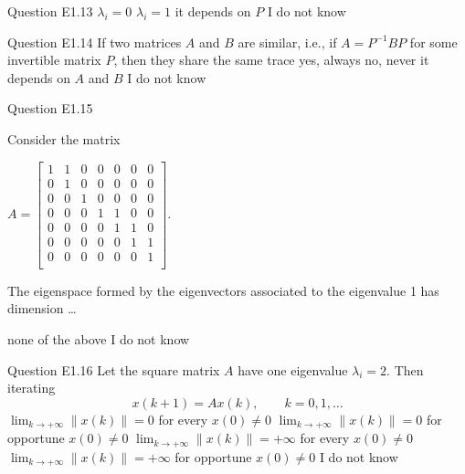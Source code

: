\begin{frame}{Question E1.13}
	\QuestionAnswers
	{
		\correctanswer $\lambda_{i} = 0$
		\answer $\lambda_{i} = 1$
		\answer it depends on $P$
		\answer I do not know
	}
	\QuestionSolution{}
	\QuestionAuthor{}
	\QuestionVersion{}
\end{frame}


\begin{frame}{Question E1.14}
	\QuestionBody
	{
		If two matrices $A$ and $B$ are similar, i.e., if
		$A = P^{-1} B P$
		for some invertible matrix $P$, then they share the same trace
	}
	\QuestionAnswers
	{
		\correctanswer yes, always
		\answer no, never
		\answer it depends on $A$ and $B$
		\answer I do not know
	}
	\QuestionSolution{}
	\QuestionAuthor{}
	\QuestionVersion{}
\end{frame}


\begin{frame}{Question E1.15}
	\QuestionBody
	{
		Consider the matrix
		\begin{small}
		$
		A = 
		\begin{bmatrix}
			1 & 1 & 0 & 0 & 0 & 0 & 0 \\
			0 & 1 & 0 & 0 & 0 & 0 & 0 \\
			0 & 0 & 1 & 0 & 0 & 0 & 0 \\
			0 & 0 & 0 & 1 & 1 & 0 & 0 \\
			0 & 0 & 0 & 0 & 1 & 1 & 0 \\
			0 & 0 & 0 & 0 & 0 & 1 & 1 \\
			0 & 0 & 0 & 0 & 0 & 0 & 1 \\
		\end{bmatrix} .
		$
		\end{small}
		The eigenspace formed by the eigenvectors associated to the eigenvalue 1 has dimension \ldots
	}
	\QuestionAnswers
	{
		\answer none of the above
		\answer I do not know
	}
	\QuestionSolution{}
	\QuestionAuthor{}
	\QuestionVersion{}
\end{frame}


\begin{frame}{Question E1.16}
	\QuestionBody
	{
		Let the square matrix $A$ have one eigenvalue $\lambda_{i} = 2$. Then iterating
		$$x(k+1) = A x(k), \qquad k = 0, 1, \ldots$$
	}
	\QuestionAnswers
	{
		\answer $\lim_{k \rightarrow +\infty} \left\| x(k) \right\| = 0$ for every $x(0) \neq 0$
		\answer $\lim_{k \rightarrow +\infty} \left\| x(k) \right\| = 0$ for opportune $x(0) \neq 0$
		\answer $\lim_{k \rightarrow +\infty} \left\| x(k) \right\| = + \infty$ for every $x(0) \neq 0$
		\correctanswer $\lim_{k \rightarrow +\infty} \left\| x(k) \right\| = + \infty$ for opportune $x(0) \neq 0$
		\answer I do not know
	}
	\QuestionSolution{}
	\QuestionAuthor{}
	\QuestionVersion{}
\end{frame}



